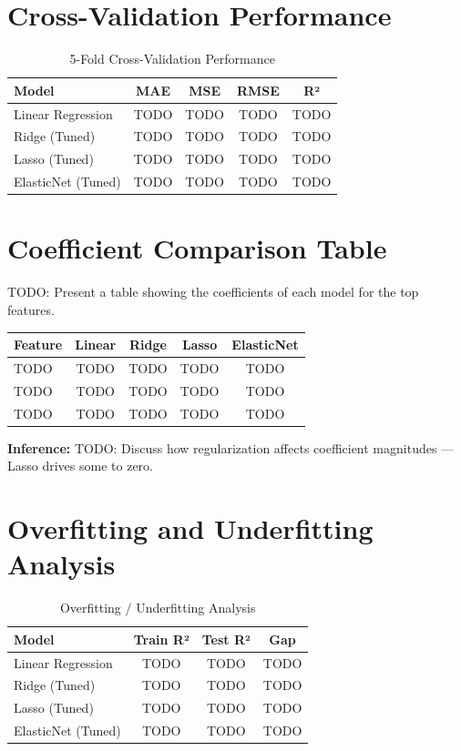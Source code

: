 \documentclass[12pt,a4paper]{article}
\begin{document}
\section{Cross-Validation Performance}
\begin{table}[H]
\centering
\begin{tabular}{lcccc}
\toprule
\textbf{Model} & \textbf{MAE} & \textbf{MSE} & \textbf{RMSE} & \textbf{R²} \\ \midrule
Linear Regression & TODO & TODO & TODO & TODO \\
Ridge (Tuned) & TODO & TODO & TODO & TODO \\
Lasso (Tuned) & TODO & TODO & TODO & TODO \\
ElasticNet (Tuned) & TODO & TODO & TODO & TODO \\
\bottomrule
\end{tabular}
\caption{5-Fold Cross-Validation Performance}
\end{table}

\section{Coefficient Comparison Table}
TODO: Present a table showing the coefficients of each model for the top features.

\begin{longtable}{lcccc}
\toprule
\textbf{Feature} & \textbf{Linear} & \textbf{Ridge} & \textbf{Lasso} & \textbf{ElasticNet} \\ \midrule
TODO & TODO & TODO & TODO & TODO \\
TODO & TODO & TODO & TODO & TODO \\
TODO & TODO & TODO & TODO & TODO \\
\bottomrule
\end{longtable}

\textbf{Inference:}
TODO: Discuss how regularization affects coefficient magnitudes — Lasso drives some to zero.

\section{Overfitting and Underfitting Analysis}
\begin{table}[H]
\centering
\begin{tabular}{lccc}
\toprule
\textbf{Model} & \textbf{Train R²} & \textbf{Test R²} & \textbf{Gap} \\ \midrule
Linear Regression & TODO & TODO & TODO \\
Ridge (Tuned) & TODO & TODO & TODO \\
Lasso (Tuned) & TODO & TODO & TODO \\
ElasticNet (Tuned) & TODO & TODO & TODO \\
\bottomrule
\end{tabular}
\caption{Overfitting / Underfitting Analysis}
\end{table}
\end{document}

